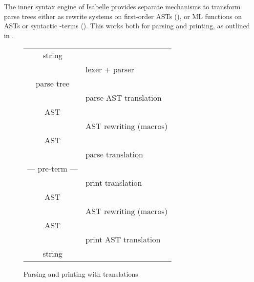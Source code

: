 \begin{isabellebody}
\begin{isamarkuptext}
\begin{description}
  \end{description}%
\end{isamarkuptext}%
\isamarkuptrue%
%
\isamarkuptrue%
%
\begin{isamarkuptext}%
The inner syntax engine of Isabelle provides separate
  mechanisms to transform parse trees either as rewrite systems on
  first-order ASTs (), or ML functions on ASTs
  or syntactic -terms ().  This works
  both for parsing and printing, as outlined in
  .

  \begin{figure}[htbp]
  \begin{center}
  \begin{tabular}{cl}
  string          & \\
  \isa{{\isaliteral{22}{\isachardoublequote}}{\isaliteral{5C3C646F776E3E}{\isasymdown}}{\isaliteral{22}{\isachardoublequote}}}     & lexer + parser \\
  parse tree      & \\
  \isa{{\isaliteral{22}{\isachardoublequote}}{\isaliteral{5C3C646F776E3E}{\isasymdown}}{\isaliteral{22}{\isachardoublequote}}}     & parse AST translation \\
  AST             & \\
  \isa{{\isaliteral{22}{\isachardoublequote}}{\isaliteral{5C3C646F776E3E}{\isasymdown}}{\isaliteral{22}{\isachardoublequote}}}     & AST rewriting (macros) \\
  AST             & \\
  \isa{{\isaliteral{22}{\isachardoublequote}}{\isaliteral{5C3C646F776E3E}{\isasymdown}}{\isaliteral{22}{\isachardoublequote}}}     & parse translation \\
  --- pre-term ---    & \\
  \isa{{\isaliteral{22}{\isachardoublequote}}{\isaliteral{5C3C646F776E3E}{\isasymdown}}{\isaliteral{22}{\isachardoublequote}}}     & print translation \\
  AST             & \\
  \isa{{\isaliteral{22}{\isachardoublequote}}{\isaliteral{5C3C646F776E3E}{\isasymdown}}{\isaliteral{22}{\isachardoublequote}}}     & AST rewriting (macros) \\
  AST             & \\
  \isa{{\isaliteral{22}{\isachardoublequote}}{\isaliteral{5C3C646F776E3E}{\isasymdown}}{\isaliteral{22}{\isachardoublequote}}}     & print AST translation \\
  string          &
  \end{tabular}
  \end{center}
  \caption{Parsing and printing with translations}\label{fig:parse-print}
  \end{figure}


\end{isamarkuptext}
\end{isabellebody}
